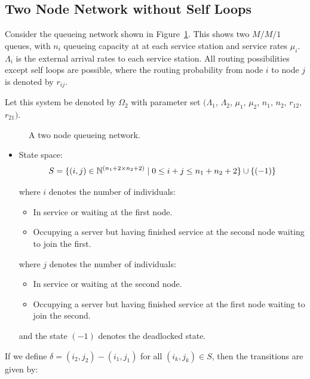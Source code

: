 \documentclass{article}
\begin{document}
\subsection{Two Node Network without Self Loops}\label{sec:2nodewithoutselfloops}
Consider the queueing network shown in Figure~\ref{fig:queueingnetwork_2nodes}.
This shows two \(M/M/1\) queues, with \(n_i\) queueing capacity at at each service station and service rates $\mu_i$.
$\Lambda_i$ is the external arrival rates to each service station.
All routing possibilities except self loops are possible, where the routing probability from node $i$ to node $j$ is denoted by $r_{ij}$.

Let this system be denoted by $\Omega_2$ with parameter set $(\Lambda_1$, $\Lambda_2$, $\mu_1$, $\mu_2$, $n_1$, $n_2$, $r_{12}$, $r_{21})$.

\begin{figure}[!htbp]
  
  \caption{A two node queueing network.}
  \label{fig:queueingnetwork_2nodes}
\end{figure}

\begin{itemize}
    \item State space:
        \[S = \{(i,j)\in\mathbb{N}^{(n_1+2\times n_2+2)} \nonscript\; | \nonscript\; 0 \leq i + j \leq n_1 + n_2 + 2
        \}\cup\{(-1)\}\]

        where \(i\) denotes the number of individuals:
            \begin{itemize}
                \item In service or waiting at the first node.
                \item Occupying a server but having finished service at the
                    second node waiting to join the first.
            \end{itemize}
        where \(j\) denotes the number of individuals:
            \begin{itemize}
                \item In service or waiting at the second node.
                \item Occupying a server but having finished service at the
                    first node waiting to join the second.
            \end{itemize}
        and the state $(-1)$ denotes the deadlocked state.
\end{itemize}

If we define $\delta = (i_2, j_2) - (i_1, j_1)$ for all $(i_k, j_k) \in S$, then the transitions are given by:
\end{document}
